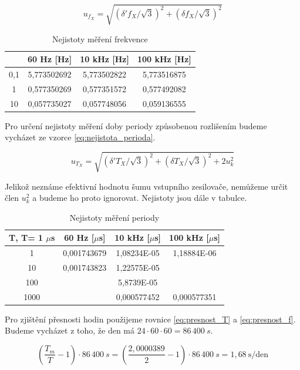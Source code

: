 \documentclass[a4paper,12pt]{article}   %
\newcommand{\tmu}{$\mu$}
\begin{document}
\begin{equation}
  u_{f_X} = \sqrt{\left(\delta'f_X/\sqrt{3}\right)^2+\left(\delta f_X/\sqrt{3}\right)^2}
  \label{eq:nejistota_frce}
\end{equation}

\begin{table}
  \centering
  \begin{tabular}{|c|c|c|c|}
    &60 Hz [Hz]&10 kHz [Hz]&100 kHz [Hz]\\\hline\hline
    0,1&5,773502692&5,773502822&5,773516875\\\hline
    1&0,577350269&0,577351572&0,577492082\\\hline
    10&0,057735027&0,057748056&0,059136555\\\hline
  \end{tabular}
  \caption{Nejistoty měření frekvence}
\end{table}

Pro určení nejistoty měření doby periody způsobenou rozlišením budeme vycházet ze vzorce \ref{eq:nejistota_perioda}.

\begin{equation}
  u_{T_X} = \sqrt{\left(\delta'T_X/\sqrt{3}\right)^2+\left(\delta T_X/\sqrt{3}\right)^2+2u_k^2}
  \label{eq:nejistota_perioda}
\end{equation}

Jelikož neznáme efektivní hodnotu šumu vstupního zesilovače, nemůžeme určit člen $u_k^2$ a budeme ho proto ignorovat. Nejistoty jsou dále v tabulce.

\begin{table}[h!]
  \centering
  \begin{tabular}{|c|c|c|c|}
    T, T= 1 \tmu s&60 Hz [\tmu s]&10 kHz [\tmu s]&100 kHz [\tmu s]\\\hline\hline
    1&0,001743679&1,08234E-05&1,18884E-06\\\hline
    10&0,001743823&1,22575E-05&\\\hline
    100&&5,8739E-05&\\\hline
    1000&&0,000577452&0,000577351\\\hline
  \end{tabular}
  \caption{Nejistoty měření periody}
\end{table}

Pro zjištění přesnosti hodin použijeme rovnice \ref{eq:presnost_T} a \ref{eq:presnost_f}. Budeme vycházet z toho, že den má $24\cdot 60\cdot 60 = 86\,400~s$. 

\begin{equation}
  \left(\frac{T_m}{T}-1\right)\cdot 86\,400~s = \left(\frac{2,0000389}{2}-1\right)\cdot 86\,400~s = 1,68~\textrm{s/den}
  \label{eq:presnost_T}
\end{equation}
\end{document}
